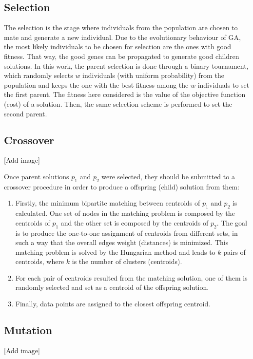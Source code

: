 \subsection{Selection}
The selection is the stage where individuals from the population are chosen to mate and generate a new individual. Due to the evolutionary behaviour of GA, the most likely individuals to be chosen for selection are the ones with good fitness. That way, the good genes can be propagated to generate good children solutions. In this work, the parent selection is done through a binary tournament, which randomly selects $w$ individuals (with uniform probability) from the population and keeps the one with the best fitness among the $w$ individuals to set the first parent. The fitness here considered is the value of the objective function (cost) of a solution. Then, the same selection scheme is performed to set the second parent.

\subsection{Crossover}
[Add image]

Once parent solutions $p_1$ and $p_2$ were selected, they should be submitted to a crossover procedure in order to produce a offspring (child) solution from them:

\begin{enumerate}
	\item Firstly, the minimum bipartite matching between centroids of $p_1$ and $p_2$ is calculated. One set of nodes in the matching problem is composed by the centroids of $p_1$ and the other set is composed by the centroids of $p_2$. The goal is to produce the one-to-one assignment of centroids from different sets, in such a way that the overall edges weight (distances) is minimized. This matching problem is solved by the Hungarian method and leads to $k$ pairs of centroids, where $k$ is the number of clusters (centroids).

	\item For each pair of centroids resulted from the matching solution, one of them is randomly selected and set as a centroid of the offspring solution.

	\item Finally, data points are assigned to the closest offspring centroid.
\end{enumerate}

\subsection{Mutation}
[Add image]

